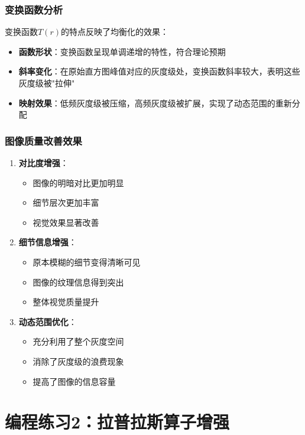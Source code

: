 \documentclass[a4paper]{article}
\begin{document}
\subsubsection{变换函数分析}

变换函数$T(r)$的特点反映了均衡化的效果：

\begin{itemize}
    \item \textbf{函数形状}：变换函数呈现单调递增的特性，符合理论预期
    \item \textbf{斜率变化}：在原始直方图峰值对应的灰度级处，变换函数斜率较大，表明这些灰度级被"拉伸"
    \item \textbf{映射效果}：低频灰度级被压缩，高频灰度级被扩展，实现了动态范围的重新分配
\end{itemize}

\subsubsection{图像质量改善效果}

\begin{enumerate}
    \item \textbf{对比度增强}：
    \begin{itemize}
        \item 图像的明暗对比更加明显
        \item 细节层次更加丰富
        \item 视觉效果显著改善
    \end{itemize}
    
    \item \textbf{细节信息增强}：
    \begin{itemize}
        \item 原本模糊的细节变得清晰可见
        \item 图像的纹理信息得到突出
        \item 整体视觉质量提升
    \end{itemize}
    
    \item \textbf{动态范围优化}：
    \begin{itemize}
        \item 充分利用了整个灰度空间
        \item 消除了灰度级的浪费现象
        \item 提高了图像的信息容量
    \end{itemize}
\end{enumerate}

\section{编程练习2：拉普拉斯算子增强}
\end{document}
